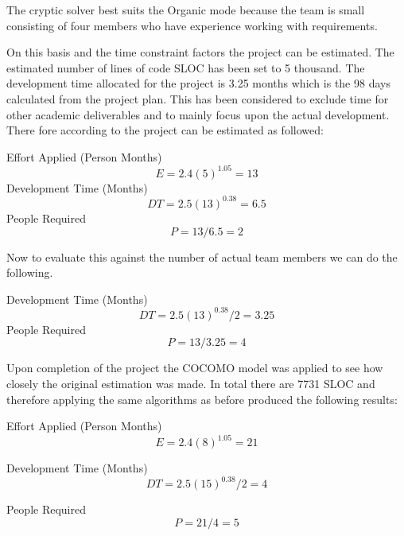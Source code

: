 The cryptic solver best suits the Organic mode because the team is small 
consisting of four members who have experience working with requirements. 

On this basis and the time constraint factors the project can be estimated. 
The estimated number of lines of code SLOC has been set to 5 thousand. The
development time allocated for the project is 3.25 months which is the 98 days
calculated from the project plan. This has been considered to exclude time for
other academic deliverables and to mainly focus upon the actual development.
There fore according to \citet{cocomo2} the project can be estimated as
followed:

Effort Applied (Person Months)
\[
  E = 2.4(5)^{1.05} = 13
\]
Development Time (Months)
\[
  DT = 2.5(13)^{0.38} = 6.5 
\]
People Required
\[
  P = 13/6.5 = 2
\]

Now to evaluate this against the number of actual team members we can do the 
following.

Development Time (Months)
\[
  DT = 2.5(13)^{0.38}/2 = 3.25
\]
People Required
\[
  P = 13/3.25 = 4
\]

Upon completion of the project the COCOMO model was applied to see how closely 
the original estimation was made. In total there are 7731 SLOC and therefore 
applying the same algorithms as before produced the following results:

Effort Applied (Person Months)
\[
  E = 2.4(8)^{1.05} = 21
\]

Development Time (Months)
\[
  DT = 2.5(15)^{0.38}/2 = 4
\]

People Required
\[
  P = 21/4 = 5
\]
